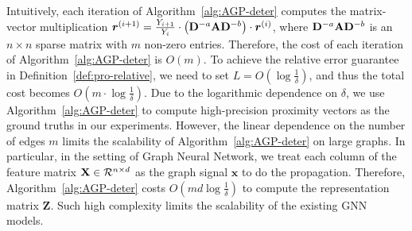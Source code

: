 Intuitively, each iteration of Algorithm~\ref{alg:AGP-deter}  computes the matrix-vector multiplication $\bm{r}^{(i+1)}=\frac{Y_{i+1}}{Y_i}\cdot\left(\mathbf{D}^{-a}\mathbf{A}\mathbf{D}^{-b}\right)\cdot \bm{r}^{(i)}$, where $\mathbf{D}^{-a}\mathbf{A}\mathbf{D}^{-b}$ is an  $n\times n$ sparse matrix with $m$ non-zero entries. Therefore, the cost of each iteration of Algorithm~\ref{alg:AGP-deter}  is $O(m)$. To achieve the relative error guarantee in Definition~\ref{def:pro-relative}, we need to set $L=O\left(\log{\frac{1}{\delta}} \right)$, and thus the total cost becomes $O\left(m\cdot \log{\frac{1}{ \delta}}\right)$.  Due to the logarithmic dependence on $\delta$, we use Algorithm~\ref{alg:AGP-deter} to compute high-precision proximity vectors as the ground truths in our experiments. 
However, the linear dependence on the number of edges $m$ limits the scalability of Algorithm~\ref{alg:AGP-deter} on large graphs. In particular, in the setting of Graph Neural Network, we treat each column of the feature matrix $\mathbf{X} \in \mathcal{R}^{n \times d}$ as the graph signal $\bm{x}$ to do the propagation. 
Therefore, Algorithm~\ref{alg:AGP-deter} costs $O\left(md \log  \frac{1}{\delta}\right)$ to compute the representation matrix $\mathbf{Z}$. Such high complexity limits the scalability of the existing GNN models.








